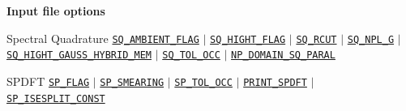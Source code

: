 \begin{frame}[allowframebreaks]{\textbf{Input file options}} \label{Index}
\vspace{-2mm}
 \begin{block}{Spectral Quadrature}
\hyperlink{SQ_AMBIENT_FLAG}{\texttt{SQ\_AMBIENT\_FLAG}} $\vert$ 
\hyperlink{SQ_HIGHT_FLAG}{\texttt{SQ\_HIGHT\_FLAG}} $\vert$ 
\hyperlink{SQ_RCUT}{\texttt{SQ\_RCUT}} $\vert$ 
\hyperlink{SQ_NPL_G}{\texttt{SQ\_NPL\_G}}  $\vert$ 
\hyperlink{SQ_HIGHT_GAUSS_HYBRID_MEM}{\texttt{SQ\_HIGHT\_GAUSS\_HYBRID\_MEM}} $\vert$ 
\hyperlink{SQ_TOL_OCC}{\texttt{SQ\_TOL\_OCC}} $\vert$ 
\hyperlink{NP_DOMAIN_SQ_PARAL}{\texttt{NP\_DOMAIN\_SQ\_PARAL}} 
\end{block}
\begin{block}{SPDFT}
\hyperlink{SP_FLAG}{\texttt{SP\_FLAG}} $\vert$ 
\hyperlink{SP_SMEARING}{\texttt{SP\_SMEARING}} $\vert$ 
\hyperlink{SP_TOL_OCC}{\texttt{SP\_TOL\_OCC}} $\vert$ 
\hyperlink{PRINT_SPDFT}{\texttt{PRINT\_SPDFT}}  $\vert$ 
\hyperlink{SP_ISESPLIT_CONST}{\texttt{SP\_ISESPLIT\_CONST}} 
\end{block}

\end{frame}

